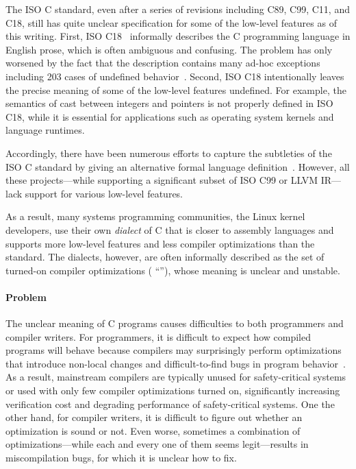 The ISO C standard, even after a series of revisions including C89, C99, C11, and C18, still has
quite unclear specification for some of the low-level features as of this writing.  First, ISO
C18~\cite{c18} informally describes the C programming language in English prose, which is often
ambiguous and confusing.  The problem has only worsened by the fact that the description contains
many ad-hoc exceptions including 203 cases of undefined behavior~\cite[J.2]{c18}.  Second, ISO C18
intentionally leaves the precise meaning of some of the low-level features undefined.  For example,
the semantics of cast between integers and pointers is not properly defined in ISO C18, while it is
essential for applications such as operating system kernels and language runtimes.

Accordingly, there have been numerous efforts to capture the subtleties of the ISO C standard by
giving an alternative formal language
definition~\cite{leroy:compcert,vellvm,ellison2012executable,norrish1998c,krebbers}.  However, all
these projects---while supporting a significant subset of ISO C99 or LLVM IR---lack support for
various low-level features.

As a result, many systems programming communities, \eg{} the Linux kernel developers, use their own
\emph{dialect} of C that is closer to assembly languages and supports more low-level features and
less compiler optimizations than the standard.  The dialects, however, are often informally
described as the set of turned-on compiler optimizations (\eg{} ``''), whose meaning
is unclear and unstable.


\paragraph{Problem}

The unclear meaning of C programs causes difficulties to both programmers and compiler writers.  For
programmers, it is difficult to expect how compiled programs will behave because compilers may
surprisingly perform optimizations that introduce non-local changes and difficult-to-find bugs in
program behavior~\cite{wang2013towards,yang2011finding}.  As a result, mainstream compilers are
typically unused for safety-critical systems or used with only few compiler optimizations turned on,
significantly increasing verification cost and degrading performance of safety-critical systems.
One the other hand, for compiler writers, it is difficult to figure out whether an optimization is
sound or not.  Even worse, sometimes a combination of optimizations---while each and every one of
them seems legit---results in miscompilation bugs, for which it is unclear how to fix.

